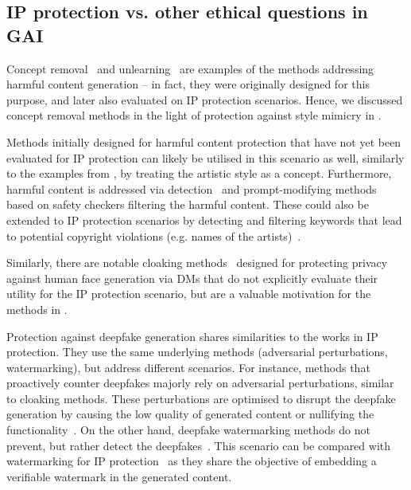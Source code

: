 \documentclass[conference,table]{IEEEtran}
\begin{document}
\subsection{IP protection vs. other ethical questions in GAI}
Concept removal~\cite{liu_geom-erasing_2023,ho_classifier-free_2022} and unlearning~\cite{wu_erasediff_2024} are examples of the methods addressing harmful content generation -- in fact, they were originally designed for this purpose, and later also evaluated on IP protection scenarios.
Hence, we discussed concept removal methods in the light of protection against style mimicry in . 

Methods initially designed for harmful content protection that have not yet been evaluated for IP protection can likely be utilised in this scenario as well, similarly to the examples from , by treating the artistic style as a concept.
Furthermore, harmful content is addressed via detection~\cite{rando_red-teaming_2022} and prompt-modifying methods~\cite{hanu_detoxify_2020} based on safety checkers filtering the harmful content. 
These could also be extended to IP protection scenarios by detecting and filtering keywords that lead to potential copyright violations (e.g. names of the artists)~\cite{noauthor_openai_2023}.

Similarly, there are notable cloaking methods~\cite{wu_towards_2023} designed for protecting privacy against human face generation via DMs that do not explicitly evaluate their utility for the IP protection scenario, but are a valuable motivation for the methods in .

Protection against deepfake generation shares similarities to the works in IP protection. 
They use the same underlying methods (adversarial perturbations, watermarking), but address different scenarios.
For instance, methods that proactively counter deepfakes majorly rely on adversarial perturbations, similar to cloaking methods. 
These perturbations are optimised to disrupt the deepfake generation by causing the low quality of generated content or nullifying the functionality~\cite{ruiz_disrupting_2020,dong_restricted_2023,ruiz_practical_2023}. 
On the other hand, deepfake watermarking methods do not prevent, but rather detect the deepfakes~\cite{wang_faketagger_2021,wu_sepmark_2023}. 
This scenario can be compared with watermarking for IP protection~\cite{lederer_identifying_2023} as they share the objective of embedding a verifiable watermark in the generated content.
\end{document}
